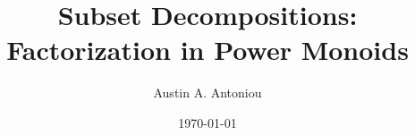 \documentclass{report}
\title{Subset Decompositions: Factorization in Power Monoids}
\author{Austin A. Antoniou}
\date{\today}
\begin{document}
\maketitle

\tableofcontents









\newpage
\nocite{*}


\end{document}
